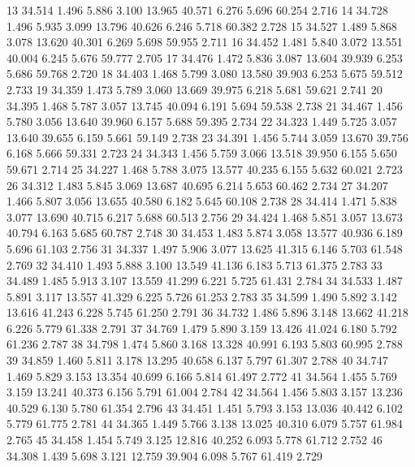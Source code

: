 \documentclass[a4paper,11pt]{scrartcl}
\begin{document}
\begin{Schunk}
\begin{Soutput}
13  34.514  1.496  5.886  3.100 13.965   40.571  6.276  5.696   60.254  2.716
14  34.728  1.496  5.935  3.099 13.796   40.626  6.246  5.718   60.382  2.728
15  34.527  1.489  5.868  3.078 13.620   40.301  6.269  5.698   59.955  2.711
16  34.452  1.481  5.840  3.072 13.551   40.004  6.245  5.676   59.777  2.705
17  34.476  1.472  5.836  3.087 13.604   39.939  6.253  5.686   59.768  2.720
18  34.403  1.468  5.799  3.080 13.580   39.903  6.253  5.675   59.512  2.733
19  34.359  1.473  5.789  3.060 13.669   39.975  6.218  5.681   59.621  2.741
20  34.395  1.468  5.787  3.057 13.745   40.094  6.191  5.694   59.538  2.738
21  34.467  1.456  5.780  3.056 13.640   39.960  6.157  5.688   59.395  2.734
22  34.323  1.449  5.725  3.057 13.640   39.655  6.159  5.661   59.149  2.738
23  34.391  1.456  5.744  3.059 13.670   39.756  6.168  5.666   59.331  2.723
24  34.343  1.456  5.759  3.066 13.518   39.950  6.155  5.650   59.671  2.714
25  34.227  1.468  5.788  3.075 13.577   40.235  6.155  5.632   60.021  2.723
26  34.312  1.483  5.845  3.069 13.687   40.695  6.214  5.653   60.462  2.734
27  34.207  1.466  5.807  3.056 13.655   40.580  6.182  5.645   60.108  2.738
28  34.414  1.471  5.838  3.077 13.690   40.715  6.217  5.688   60.513  2.756
29  34.424  1.468  5.851  3.057 13.673   40.794  6.163  5.685   60.787  2.748
30  34.453  1.483  5.874  3.058 13.577   40.936  6.189  5.696   61.103  2.756
31  34.337  1.497  5.906  3.077 13.625   41.315  6.146  5.703   61.548  2.769
32  34.410  1.493  5.888  3.100 13.549   41.136  6.183  5.713   61.375  2.783
33  34.489  1.485  5.913  3.107 13.559   41.299  6.221  5.725   61.431  2.784
34  34.533  1.487  5.891  3.117 13.557   41.329  6.225  5.726   61.253  2.783
35  34.599  1.490  5.892  3.142 13.616   41.243  6.228  5.745   61.250  2.791
36  34.732  1.486  5.896  3.148 13.662   41.218  6.226  5.779   61.338  2.791
37  34.769  1.479  5.890  3.159 13.426   41.024  6.180  5.792   61.236  2.787
38  34.798  1.474  5.860  3.168 13.328   40.991  6.193  5.803   60.995  2.788
39  34.859  1.460  5.811  3.178 13.295   40.658  6.137  5.797   61.307  2.788
40  34.747  1.469  5.829  3.153 13.354   40.699  6.166  5.814   61.497  2.772
41  34.564  1.455  5.769  3.159 13.241   40.373  6.156  5.791   61.004  2.784
42  34.564  1.456  5.803  3.157 13.236   40.529  6.130  5.780   61.354  2.796
43  34.451  1.451  5.793  3.153 13.036   40.442  6.102  5.779   61.775  2.781
44  34.365  1.449  5.766  3.138 13.025   40.310  6.079  5.757   61.984  2.765
45  34.458  1.454  5.749  3.125 12.816   40.252  6.093  5.778   61.712  2.752
46  34.308  1.439  5.698  3.121 12.759   39.904  6.098  5.767   61.419  2.729

\end{Soutput}
\end{Schunk}
\end{document}
